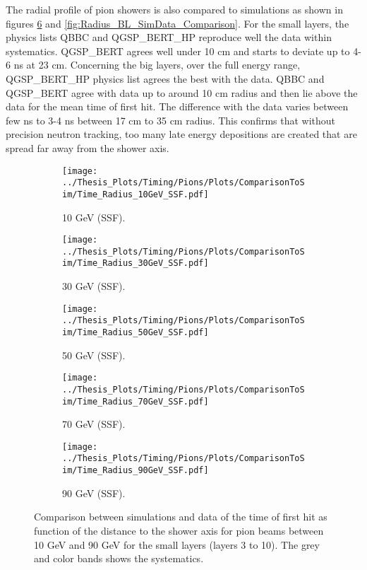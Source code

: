 The radial profile of pion showers is also compared to simulations as shown in figures \ref{fig:Radius_SSF_SimData_Comparison} and \ref{fig:Radius_BL_SimData_Comparison}. For the small layers, the physics lists QBBC and QGSP\_BERT\_HP reproduce well the data within systematics. QGSP\_BERT agrees well under 10 cm and starts to deviate up to 4-6 ns at 23 cm. Concerning the big layers, over the full energy range, QGSP\_BERT\_HP physics list agrees the best with the data. QBBC and QGSP\_BERT agree with data up to around 10 cm radius and then lie above the data for the mean time of first hit. The difference with the data varies between few ns to 3-4 ns between 17 cm to 35 cm radius. This confirms that without precision neutron tracking, too many late energy depositions are created that are spread far away from the shower axis.

\begin{figure}[htbp!]
	\begin{subfigure}[t]{0.5\textwidth}
		\centering
		\texttt{[image: ../Thesis\_Plots/Timing/Pions/Plots/ComparisonToSim/Time\_Radius\_10GeV\_SSF.pdf]}
		\caption{10 GeV (SSF).} \label{fig:Radius_SSF_SimData_10GeV}
	\end{subfigure}
	\hfill
	\begin{subfigure}[t]{0.5\textwidth}
		\centering
		\texttt{[image: ../Thesis\_Plots/Timing/Pions/Plots/ComparisonToSim/Time\_Radius\_30GeV\_SSF.pdf]}
		\caption{30 GeV (SSF).} \label{fig:Radius_SSF_SimData_30GeV}
	\end{subfigure}
	\hfill
	\begin{subfigure}[t]{0.5\textwidth}
		\centering
		\texttt{[image: ../Thesis\_Plots/Timing/Pions/Plots/ComparisonToSim/Time\_Radius\_50GeV\_SSF.pdf]}
		\caption{50 GeV (SSF).} \label{fig:Radius_SSF_SimData_50GeV}
	\end{subfigure}
	\hfill
	\begin{subfigure}[t]{0.5\textwidth}
		\centering
		\texttt{[image: ../Thesis\_Plots/Timing/Pions/Plots/ComparisonToSim/Time\_Radius\_70GeV\_SSF.pdf]}
		\caption{70 GeV (SSF).} \label{fig:Radius_SSF_SimData_70GeV}
	\end{subfigure}
	\hfill
	\begin{subfigure}[t]{0.5\textwidth}
		\centering
		\texttt{[image: ../Thesis\_Plots/Timing/Pions/Plots/ComparisonToSim/Time\_Radius\_90GeV\_SSF.pdf]}
		\caption{90 GeV (SSF).} \label{fig:Radius_SSF_SimData_90GeV}
	\end{subfigure}
	\caption{Comparison between simulations and data of the time of first hit as function of the distance to the shower axis for pion beams between 10 GeV and 90 GeV for the small layers (layers 3 to 10). The grey and color bands shows the systematics.}
	\label{fig:Radius_SSF_SimData_Comparison}
\end{figure}

